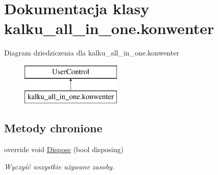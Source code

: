 \hypertarget{classkalku__all__in__one_1_1konwenter}{}\section{Dokumentacja klasy kalku\+\_\+all\+\_\+in\+\_\+one.\+konwenter}
\label{classkalku__all__in__one_1_1konwenter}
Diagram dziedziczenia dla kalku\+\_\+all\+\_\+in\+\_\+one.\+konwenter\begin{figure}[H]
\begin{center}
\leavevmode
\includegraphics[height=2.000000cm]{classkalku__all__in__one_1_1konwenter}
\end{center}
\end{figure}
\subsection*{Metody chronione}
\begin{DoxyCompactItemize}
\item 
override void \mbox{\hyperlink{classkalku__all__in__one_1_1konwenter_ae40e1dca0a5a109de89d31da42748193}{Dispose}} (bool disposing)
\begin{DoxyCompactList}\small\item\em Wyczyść wszystkie używane zasoby. \end{DoxyCompactList}\end{DoxyCompactItemize}
